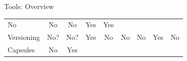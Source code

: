 \documentclass[ignorenonframetext,]{beamer}
\begin{document}
\begin{frame}{Tools: Overview}
\begin{longtable}[]{@{}lcccccccc@{}}
\begin{minipage}[t]{0.07\columnwidth}
No\strut
\end{minipage} & \begin{minipage}[t]{0.04\columnwidth}\centering
No\strut
\end{minipage} & \begin{minipage}[t]{0.06\columnwidth}\centering
No\strut
\end{minipage} & \begin{minipage}[t]{0.15\columnwidth}\centering
Yes\strut
\end{minipage} & \begin{minipage}[t]{0.18\columnwidth}\centering
Yes\strut
\end{minipage}\tabularnewline
\begin{minipage}[t]{0.12\columnwidth}\raggedright
Versioning\strut
\end{minipage} & \begin{minipage}[t]{0.05\columnwidth}\centering
No?\strut
\end{minipage} & \begin{minipage}[t]{0.05\columnwidth}\centering
No?\strut
\end{minipage} & \begin{minipage}[t]{0.05\columnwidth}\centering
Yes\strut
\end{minipage} & \begin{minipage}[t]{0.07\columnwidth}\centering
No\strut
\end{minipage} & \begin{minipage}[t]{0.04\columnwidth}\centering
No\strut
\end{minipage} & \begin{minipage}[t]{0.06\columnwidth}\centering
No\strut
\end{minipage} & \begin{minipage}[t]{0.15\columnwidth}\centering
Yes\strut
\end{minipage} & \begin{minipage}[t]{0.18\columnwidth}\centering
No\strut
\end{minipage}\tabularnewline
\begin{minipage}[t]{0.12\columnwidth}\raggedright
Capsules\strut
\end{minipage} & \begin{minipage}[t]{0.05\columnwidth}\centering
No\strut
\end{minipage} & \begin{minipage}[t]{0.05\columnwidth}\centering
Yes\strut
\end{minipage} & \begin{minipage}[t]{0.05\columnwidth}\centering

\end{minipage}
\end{longtable}
\end{frame}
\end{document}
